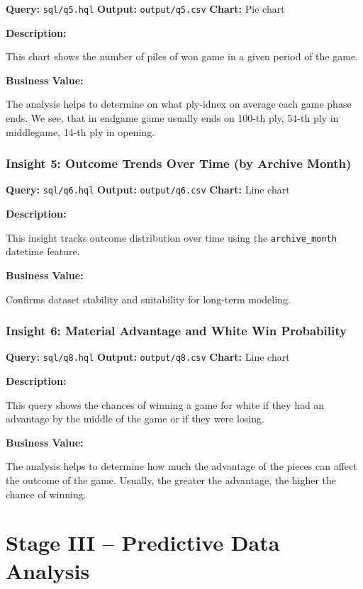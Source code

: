 \documentclass[12pt,a4paper]{article}
\begin{document}
\textbf{Query:} \texttt{sql/q5.hql}  
\textbf{Output:} \texttt{output/q5.csv}  
\textbf{Chart:} Pie chart

\textbf{Description:}

This chart shows the number of piles of won game in a given period of the game.

\textbf{Business Value:}

The analysis helps to determine on what ply-idnex on average each game phase ends. We see, that in endgame game usually ends on 100-th ply, 54-th ply in middlegame, 14-th ply in opening.
\newpage
\subsubsection{Insight 5: Outcome Trends Over Time (by Archive Month)}

\textbf{Query:} \texttt{sql/q6.hql}  
\textbf{Output:} \texttt{output/q6.csv}  
\textbf{Chart:} Line chart

\textbf{Description:}

This insight tracks outcome distribution over time using the \texttt{archive\_month} datetime feature.

\textbf{Business Value:}

Confirms dataset stability and suitability for long-term modeling.

\subsubsection{Insight 6: Material Advantage and White Win Probability}

\textbf{Query:} \texttt{sql/q8.hql}  
\textbf{Output:} \texttt{output/q8.csv}  
\textbf{Chart:} Line chart

\textbf{Description:}

This query shows the chances of winning a game for white if they had an advantage by the middle of the game or if they were losing.

\textbf{Business Value:}

The analysis helps to determine how much the advantage of the pieces can affect the outcome of the game. Usually, the greater the advantage, the higher the chance of winning.

\section{Stage III -- Predictive Data Analysis}
\end{document}
